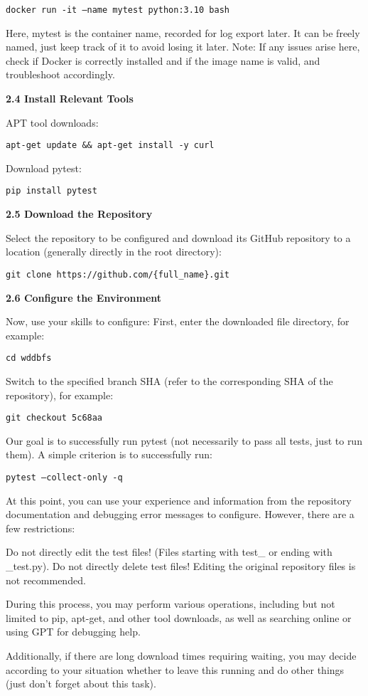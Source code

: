 \texttt{docker run -it --name mytest python:3.10 bash}

Here, mytest is the container name, recorded for log export later. It can be freely named, just keep track of it to avoid losing it later. Note: If any issues arise here, check if Docker is correctly installed and if the image name is valid, and troubleshoot accordingly.

\textbf{2.4 Install Relevant Tools}

APT tool downloads:

\texttt{apt-get update \&\& apt-get install -y curl}

Download pytest:

\texttt{pip install pytest}

\textbf{2.5 Download the Repository}

Select the repository to be configured and download its GitHub repository to a location (generally directly in the root directory):

\texttt{git clone https://github.com/\{full\_name\}.git}

\textbf{2.6 Configure the Environment}

Now, use your skills to configure: First, enter the downloaded file directory, for example:

\texttt{cd wddbfs}

Switch to the specified branch SHA (refer to the corresponding SHA of the repository), for example:

\texttt{git checkout 5c68aa}

Our goal is to successfully run pytest (not necessarily to pass all tests, just to run them). A simple criterion is to successfully run:

\texttt{pytest --collect-only -q}

At this point, you can use your experience and information from the repository documentation and debugging error messages to configure. However, there are a few restrictions:

Do not directly edit the test files! (Files starting with test\_ or ending with \_test.py).
Do not directly delete test files!
Editing the original repository files is not recommended.

During this process, you may perform various operations, including but not limited to pip, apt-get, and other tool downloads, as well as searching online or using GPT for debugging help.

Additionally, if there are long download times requiring waiting, you may decide according to your situation whether to leave this running and do other things (just don’t forget about this task).

